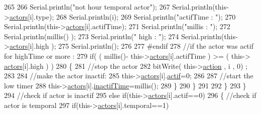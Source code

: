 \begin{DoxyCode}
265                         
266                         Serial.println(\textcolor{stringliteral}{"not hour temporal actor"});
267                         Serial.println(this->\hyperlink{classJetpack_a7e16d2f97837f9712a2e6de1c50d99db}{actors}[i].type);
268                         Serial.println(i);
269                         Serial.println(\textcolor{stringliteral}{"actifTime : "});
270                         Serial.println(this->\hyperlink{classJetpack_a7e16d2f97837f9712a2e6de1c50d99db}{actors}[i].actifTime);
271                         Serial.println(\textcolor{stringliteral}{"millis : "});
272                         Serial.println(millis() );
273                         Serial.println(\textcolor{stringliteral}{" high : "});
274                         Serial.println(this->\hyperlink{classJetpack_a7e16d2f97837f9712a2e6de1c50d99db}{actors}[i].high );
275                         Serial.println();
276                     
277 \textcolor{preprocessor}{                    #endif}
278                         \textcolor{comment}{//if the actor was actif for highTime or more :}
279                         \textcolor{keywordflow}{if}( ( millis()- this->\hyperlink{classJetpack_a7e16d2f97837f9712a2e6de1c50d99db}{actors}[i].actifTime  ) >= ( this->
      \hyperlink{classJetpack_a7e16d2f97837f9712a2e6de1c50d99db}{actors}[i].high  ) )
280                         \{
281                             \textcolor{comment}{//stop the actor}
282                             bitWrite( this->\hyperlink{classJetpack_aca3142925a7b0834b34ae91d26af7765}{action} , i , 0) ;
283 
284                             \textcolor{comment}{//make the actor inactif:}
285                             this->\hyperlink{classJetpack_a7e16d2f97837f9712a2e6de1c50d99db}{actors}[i].\hyperlink{structJetpack_1_1state_aa177541689bbaea21a4650a083b0df77}{actif}=0;
286 
287                             \textcolor{comment}{//start the low timer}
288                             this->\hyperlink{classJetpack_a7e16d2f97837f9712a2e6de1c50d99db}{actors}[i].\hyperlink{structJetpack_1_1state_aaf817b1f9e7a4d65b9e3ca4726b281f6}{inactifTime}=millis();              
289                         \}
290                     \}           
291                             
292                 \}
293             \}
294             \textcolor{comment}{//check if actor is inactif}
295             \textcolor{keywordflow}{else} \textcolor{keywordflow}{if}(this->\hyperlink{classJetpack_a7e16d2f97837f9712a2e6de1c50d99db}{actors}[i].actif==0)
296             \{   \textcolor{comment}{//check if actor is temporal}
297                 \textcolor{keywordflow}{if}(this->\hyperlink{classJetpack_a7e16d2f97837f9712a2e6de1c50d99db}{actors}[i].temporal==1)

\end{DoxyCode}
